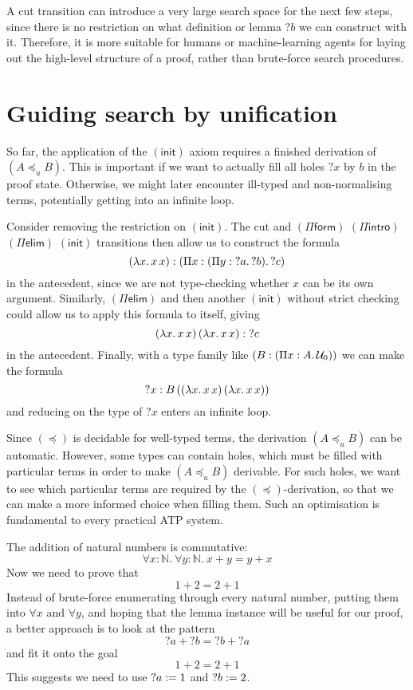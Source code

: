 \documentclass[twoside]{report}
\begin{document}
A cut transition can introduce a very large search space for the next few steps, since there is no restriction on what definition or lemma ${?b}$ we can construct with it. Therefore, it is more suitable for humans or machine-learning agents for laying out the high-level structure of a proof, rather than brute-force search procedures.

\section{Guiding search by unification}
\label{sec:tableau_unification_search}

So far, the application of the $(\mathsf{init})$ axiom requires a finished derivation of $(A \preceq_u B)$. This is important if we want to actually fill all holes ${?x}$ by $b$ in the proof state. Otherwise, we might later encounter ill-typed and non-normalising terms, potentially getting into an infinite loop.

\begin{example}
Consider removing the restriction on $(\mathsf{init})$. The cut and $(\Pi\mathsf{form})$ $(\Pi\mathsf{intro})$ $(\Pi\mathsf{elim})$ $(\mathsf{init})$ transitions then allow us to construct the formula
$$(\lambda{x}.\,{{x}\,{x}}) : (\Pi{x} : {(\Pi{y} : {?a}.\,{?b})}.\,{?c})$$
in the antecedent, since we are not type-checking whether $x$ can be its own argument. Similarly, $(\Pi\mathsf{elim})$ and then another $(\mathsf{init})$ without strict checking could allow us to apply this formula to itself, giving
$${(\lambda{x}.\,{{x}\,{x}})}\,{(\lambda{x}.\,{{x}\,{x}})} : {?c}$$
in the antecedent. Finally, with a type family like $(B : (\Pi{x} : {A}.\,{\mathcal U_0}))$ we can make the formula
$${?x} : {B}\,{(}{(\lambda{x}.\,{{x}\,{x}})}\,{(\lambda{x}.\,{{x}\,{x}})})$$
and reducing on the type of ${?x}$ enters an infinite loop.
\end{example}

Since $(\preceq)$ is decidable for well-typed terms, the derivation $(A \preceq_u B)$ can be automatic. However, some types can contain holes, which must be filled with particular terms in order to make $(A \preceq_u B)$ derivable. For such holes, we want to see which particular terms are required by the $(\preceq)$-derivation, so that we can make a more informed choice when filling them. Such an optimisation is fundamental to every practical ATP system.

\begin{example}
The addition of natural numbers is commutative:
$$\forall x : \mathbb N.\ \forall y : \mathbb N.\ x + y = y + x$$
Now we need to prove that
$$1 + 2 = 2 + 1$$
Instead of brute-force enumerating through every natural number, putting them into $\forall x$ and $\forall y$, and hoping that the lemma instance will be useful for our proof, a better approach is to look at the pattern
$${?a} + {?b} = {?b} + {?a}$$
and fit it onto the goal
$$1 + 2 = 2 + 1$$
This suggests we need to use ${?a} := 1$ and ${?b} := 2$.
\end{example}
\end{document}
